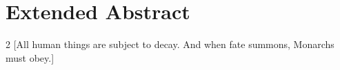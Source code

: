 \section*{\centering\LARGE Extended Abstract}
\begin{multicols}{2}
    [All human things are subject to decay. And when fate summons, Monarchs must obey.]

    \lipsum[1-9]
\end{multicols}
\restoregeometry